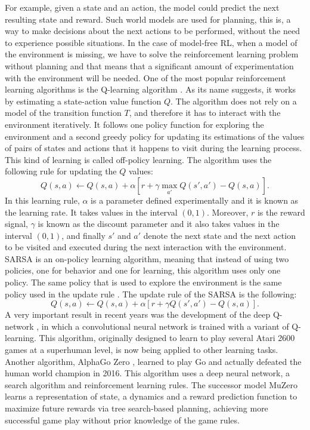 For example, given a state and an action, the model could predict the next resulting state and reward. Such world models are used for planning, this is, a way to make decisions about the next actions to be performed, without the need to experience possible situations. In the case of model-free RL, when a model of the environment is missing, we have to solve the reinforcement learning problem without planning and that means that a significant amount of experimentation with the environment will be needed.
One of the most popular reinforcement learning algorithms is the Q-learning algorithm . As its name suggests, it works by estimating a state-action value function $Q$. The algorithm does not rely on a model of the transition function $T$, and therefore it has to interact with the environment iteratively. It follows one policy function for exploring the environment and a second greedy policy for updating its estimations of the values of pairs of states and actions that it happens to visit during the learning process. This kind of learning is called off-policy learning. The algorithm uses the following rule for updating the $Q$ values:
\[Q(s,a) \leftarrow Q(s,a) + \alpha [r + \gamma \max_{a'} Q(s',a') -  Q(s,a)].\]
In this learning rule, $\alpha$ is a parameter defined experimentally and it is known as the learning rate. It takes values in the interval $(0, 1)$. Moreover, $r$ is the reward signal, $\gamma$ is known as the discount parameter and it also takes values in the interval $(0,1)$, and finally $s'$ and $a'$ denote the next state and the next action to be visited and executed during the next interaction with the environment. 
SARSA is an on-policy learning algorithm, meaning that instead of using two policies, one for behavior and one for learning, this algorithm uses only one policy. The same policy that is used to explore the environment is the same policy used in the update rule . The update rule of the SARSA is the following:
\[Q(s,a) \leftarrow Q(s,a) + \alpha [r + \gamma Q(s',a') - Q(s,a)].\]
A very important result in recent years was the development of the deep Q-network , in which a convolutional neural network is trained with a variant of Q-learning. This algorithm, originally designed to learn to play several Atari 2600 games at a superhuman level, is now being applied to other learning tasks. Another algorithm, AlphaGo Zero ,  learned to play Go and actually defeated the human world champion in 2016. This algorithm uses a deep neural network, a search algorithm and reinforcement learning rules. The successor model MuZero  learns a representation of state, a dynamics and a reward prediction function to maximize future rewards via tree search-based planning, achieving more successful game play without prior knowledge of the game rules. 
